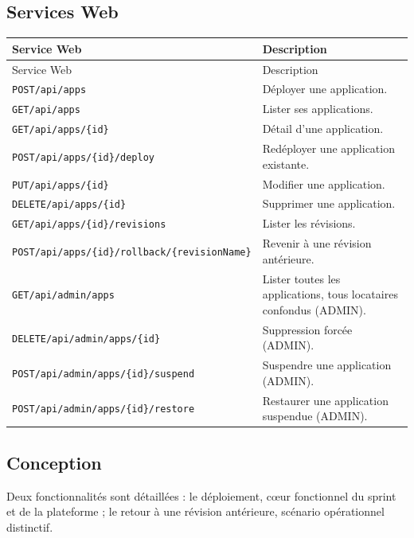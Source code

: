 \subsection{Services Web}
{\setlength{\tabcolsep}{8pt}
\begin{longtable}{|p{5.8cm}|p{8.4cm}|}
\hline
Service Web & Description \\
\hline
\endfirsthead
\hline
Service Web & Description \\
\hline
\endhead
\endfoot
\hline
\endlastfoot
\texttt{POST\slash api\slash apps} & Déployer une application. \\ \hline
\texttt{GET\slash api\slash apps} & Lister ses applications. \\ \hline
\texttt{GET\slash api\slash apps\slash\{id\}} & Détail d'une application. \\ \hline
\texttt{POST\slash api\slash apps\slash\{id\}\slash deploy} & Redéployer une application existante. \\ \hline
\texttt{PUT\slash api\slash apps\slash\{id\}} & Modifier une application. \\ \hline
\texttt{DELETE\slash api\slash apps\slash\{id\}} & Supprimer une application. \\ \hline
\texttt{GET\slash api\slash apps\slash\{id\}\slash revisions} & Lister les révisions. \\ \hline
\texttt{POST\slash api\slash apps\slash\{id\}\slash rollback\slash\{revisionName\}} & Revenir à une révision antérieure. \\ \hline
\texttt{GET\slash api\slash admin\slash apps} & Lister toutes les applications, tous locataires confondus (ADMIN). \\ \hline
\texttt{DELETE\slash api\slash admin\slash apps\slash\{id\}} & Suppression forcée (ADMIN). \\ \hline
\texttt{POST\slash api\slash admin\slash apps\slash\{id\}\slash suspend} & Suspendre une application (ADMIN). \\ \hline
\texttt{POST\slash api\slash admin\slash apps\slash\{id\}\slash restore} & Restaurer une application suspendue (ADMIN). \\ \hline
\end{longtable}}


\subsection{Conception}

Deux fonctionnalités sont détaillées : le déploiement, cœur fonctionnel du sprint et de la plateforme ; le retour à une révision antérieure, scénario opérationnel distinctif.

